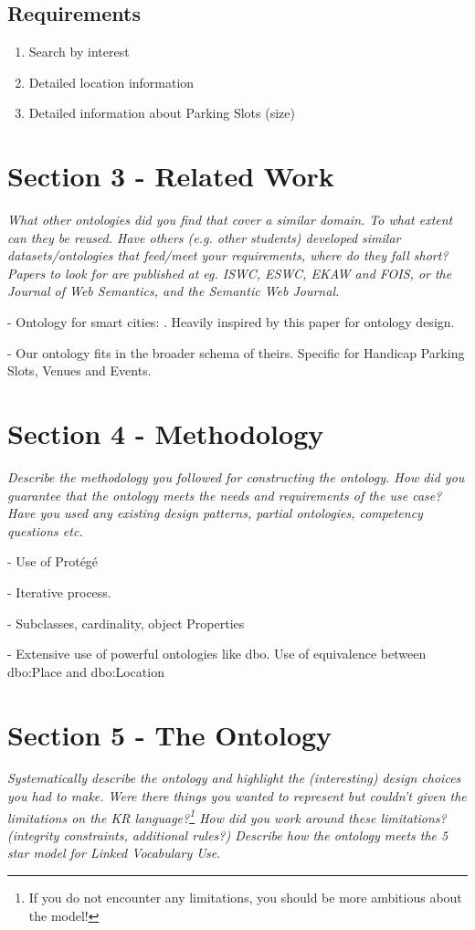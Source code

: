 \documentclass[runningheads,a4paper]{../../StyleFiles/llncs}
\begin{document}
\subsection{Requirements}

\begin{enumerate}
	\item Search by interest
	\item Detailed location information
	\item Detailed information about Parking Slots (size)
\end{enumerate}


\section{Section 3 - Related Work}
\textit{What other ontologies did you find that cover a similar domain. To what extent can they be reused. Have others (e.g. other students) developed similar datasets/ontologies that feed/meet your requirements, where do they fall short? Papers to look for are published at eg. ISWC, ESWC, EKAW and FOIS, or the Journal of Web Semantics, and the Semantic Web Journal.}

- Ontology for smart cities: \cite{komninos2015smart}. Heavily inspired by this paper for ontology design. 

- Our ontology fits in the broader schema of theirs. Specific for Handicap Parking Slots, Venues and Events. 


\section{Section 4 - Methodology}
\textit{Describe the methodology you followed for constructing the ontology. How did you guarantee that the ontology meets the needs and requirements of the use case? Have you used any existing design patterns, partial ontologies, competency questions etc.}

- Use of Protégé

- Iterative process.

- Subclasses, cardinality, object Properties

- Extensive use of powerful ontologies like dbo. Use of equivalence between dbo:Place and dbo:Location

\section{Section 5 - The Ontology}
\textit{Systematically describe the ontology and highlight the (interesting) design choices you had to make. Were there things you wanted to represent but couldn't given the limitations on the KR language?\footnote{If you do not encounter any limitations, you should be more ambitious about the model!} How did you work around these limitations? (integrity constraints, additional rules?) Describe how the ontology meets the 5 star model for Linked Vocabulary Use.}
\end{document}

